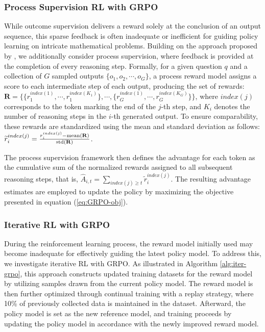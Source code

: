 \begin{itemize}[topsep=0pt]
\begin{itemize}[topsep=0pt]
\subsubsection{Process Supervision RL with GRPO} 

While outcome supervision delivers a reward solely at the conclusion of an output sequence, this sparse feedback is often inadequate or inefficient for guiding policy learning on intricate mathematical problems. Building on the approach proposed by \cite{wang2023math}, we additionally consider process supervision, where feedback is provided at the completion of every reasoning step. Formally, for a given question $q$ and a collection of $G$ sampled outputs $\{o_1, o_2, \cdots, o_G\}$, a process reward model assigns a score to each intermediate step of each output, producing the set of rewards: $\mathbf{R} = \{ \{r_1^{index(1)},\cdots,r_1^{index(K_1)}\}, \cdots,  \{r_G^{index(1)},\cdots,r_G^{index(K_G)}\} \}$, where $index(j)$ corresponds to the token marking the end of the $j$-th step, and $K_i$ denotes the number of reasoning steps in the $i$-th generated output. To ensure comparability, these rewards are standardized using the mean and standard deviation as follows: $\widetilde{r}_i^{index(j)} = \frac{r_i^{index(j)} - {\rm mean(\mathbf{R})}}{{\rm std(\mathbf{R})}}$.

The process supervision framework then defines the advantage for each token as the cumulative sum of the normalized rewards assigned to all subsequent reasoning steps, that is, $\hat{A}_{i, t} = \sum_{index(j) \ge t} \widetilde{r}_i^{index(j)}$. The resulting advantage estimates are employed to update the policy by maximizing the objective presented in equation (\ref{eq:GRPO-obj}).

\subsubsection{Iterative RL with GRPO} During the reinforcement learning process, the reward model initially used may become inadequate for effectively guiding the latest policy model. To address this, we investigate iterative RL with GRPO. As illustrated in Algorithm \ref{alg:iter-grpo}, this approach constructs updated training datasets for the reward model by utilizing samples drawn from the current policy model. The reward model is then further optimized through continual training with a replay strategy, where 10\% of previously collected data is maintained in the dataset. Afterward, the policy model is set as the new reference model, and training proceeds by updating the policy model in accordance with the newly improved reward model.


\end{itemize}
\end{itemize}
